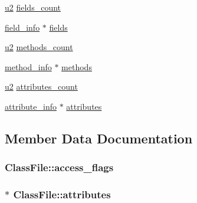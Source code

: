 \begin{DoxyCompactItemize}
\item 
\hyperlink{structures_8h_a55ef8d87fd202b8417704c089899c5b9}{u2} \hyperlink{structClassFile_acea207ee523fbc16611d3cf436c390e0}{fields\+\_\+count}
\item 
\hyperlink{structfield__info}{field\+\_\+info} $\ast$ \hyperlink{structClassFile_aa324f88c75aa96c632f8c57d010aab0c}{fields}
\item 
\hyperlink{structures_8h_a55ef8d87fd202b8417704c089899c5b9}{u2} \hyperlink{structClassFile_aacfb45d4af64216324b1ae5269c870d5}{methods\+\_\+count}
\item 
\hyperlink{structmethod__info}{method\+\_\+info} $\ast$ \hyperlink{structClassFile_ad061f06cd709d10dbfbf82f443e43632}{methods}
\item 
\hyperlink{structures_8h_a55ef8d87fd202b8417704c089899c5b9}{u2} \hyperlink{structClassFile_a633c696fbe08e7e7906b2ab1e52f3d1b}{attributes\+\_\+count}
\item 
\hyperlink{structattribute__info}{attribute\+\_\+info} $\ast$ \hyperlink{structClassFile_a8bf809db8e1008f401dc3cda5e9cdb14}{attributes}
\end{DoxyCompactItemize}


\subsection{Member Data Documentation}
\subsubsection[{\texorpdfstring{access\+\_\+flags}{access_flags}}]{ Class\+File\+::access\+\_\+flags}\hypertarget{structClassFile_ae88db578147f7ee0d6fc1aeacb341854}{}\label{structClassFile_ae88db578147f7ee0d6fc1aeacb341854}
\subsubsection[{\texorpdfstring{attributes}{attributes}}]{$\ast$ Class\+File\+::attributes}\hypertarget{structClassFile_a8bf809db8e1008f401dc3cda5e9cdb14}{}\label{structClassFile_a8bf809db8e1008f401dc3cda5e9cdb14}
